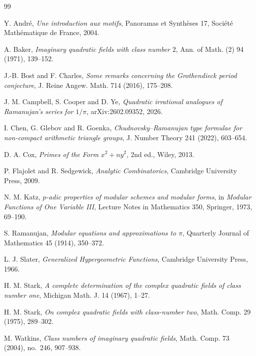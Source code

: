 \documentclass[11pt,a4paper]{amsart} %
\theoremstyle{definition}
\begin{document}
\begin{thebibliography}{99}

Y. Andr\'e,
\emph{Une introduction aux motifs},
Panoramas et Synth\`eses 17,
Soci\'et\'e Math\'ematique de France, 2004.

A. Baker,
\emph{Imaginary quadratic fields with class number \(2\)},
Ann. of Math. (2) 94 (1971), 139--152.

J.-B. Bost and F. Charles,
\emph{Some remarks concerning the Grothendieck period conjecture},
J. Reine Angew. Math. 714 (2016), 175--208.

J. M. Campbell, S. Cooper and D. Ye,
\emph{Quadratic irrational analogues of Ramanujan's series for \(1/\pi\)},
arXiv:2602.09352, 2026.

I. Chen, G. Glebov and R. Goenka,
\emph{Chudnovsky--Ramanujan type formulae for non-compact arithmetic triangle groups},
J. Number Theory 241 (2022), 603--654.

D. A. Cox,
\emph{Primes of the Form \(x^2+ny^2\)},
2nd ed., Wiley, 2013.

P. Flajolet and R. Sedgewick,
\emph{Analytic Combinatorics},
Cambridge University Press, 2009.

N. M. Katz,
\emph{\(p\)-adic properties of modular schemes and modular forms},
in \emph{Modular Functions of One Variable III},
Lecture Notes in Mathematics 350, Springer, 1973, 69--190.

S. Ramanujan,
\emph{Modular equations and approximations to \(\pi\)},
Quarterly Journal of Mathematics 45 (1914), 350--372.

L. J. Slater,
\emph{Generalized Hypergeometric Functions},
Cambridge University Press, 1966.

H. M. Stark,
\emph{A complete determination of the complex quadratic fields of class number one},
Michigan Math. J. 14 (1967), 1--27.

H. M. Stark,
\emph{On complex quadratic fields with class-number two},
Math. Comp. 29 (1975), 289--302.

M. Watkins,
\emph{Class numbers of imaginary quadratic fields},
Math. Comp. 73 (2004), no.~246, 907--938.

\end{thebibliography}
\end{document}

